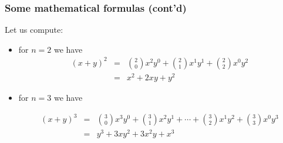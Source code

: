 \documentclass[notes=show,handout]{beamer}
\newcommand{\bea}{\begin{eqnarray}}
\newcommand{\eea}{\end{eqnarray}}
\begin{document}
\begin{frame}
\frametitle{Some mathematical formulas (cont'd)}

\begin{example}
Let us compute:
\begin{small}
\begin{itemize}



\item for $n=2$ we have
\bea
(x+y)^2 &=& {2 \choose 0}x^2 y^0 + {2 \choose 1}x^{1}y^1 +  {2 \choose 2}x^0 y^{2} \nonumber \\
  &=&  x^2 +  2 x y +  y^{2} \nonumber
\eea


\item for $n=3$ we have

\begin{small}
\bea
(x+y)^3 &=& {3 \choose 0}x^3 y^0 + {3 \choose 1}x^{2}y^1 + \cdots + {3 \choose 2}x^1 y^{2} + {3 \choose 3}x^0 y^3 \nonumber \\
&=& y^3 + 3xy^2 + 3x^2y+x^3 \nonumber
\eea
\end{small}

\end{itemize}
\end{small}


\end{example}


\end{frame}
\end{document}
